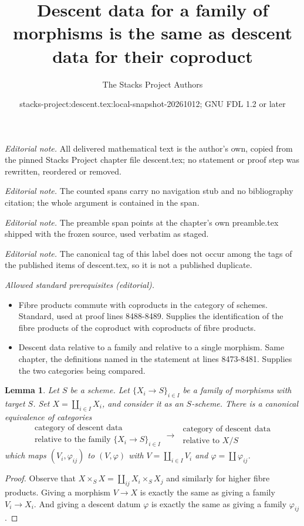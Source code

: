 \documentclass{stacks-project}
\title{Descent data for a family of morphisms is the same as descent data for their coproduct}
\author{The Stacks Project Authors}
\date{stacks-project:descent.tex:local-snapshot-20261012; GNU FDL 1.2 or later}
\theoremstyle{plain}
\newtheorem{lemma}[subsection]{Lemma}
\theoremstyle{definition}
\theoremstyle{remark}
\numberwithin{equation}{subsection}
\begin{document}
\maketitle
\noindent\textit{Editorial note.} All delivered mathematical text is the author's own, copied from the pinned Stacks Project chapter file descent.tex; no statement or proof step was rewritten, reordered or removed.\par\medskip
\noindent\textit{Editorial note.} The counted spans carry no navigation stub and no bibliography citation; the whole argument is contained in the span.\par\medskip
\noindent\textit{Editorial note.} The preamble span points at the chapter's own preamble.tex shipped with the frozen source, used verbatim as staged.\par\medskip
\noindent\textit{Editorial note.} The canonical tag of this label does not occur among the tags of the published items of descent.tex, so it is not a published duplicate.\par\medskip
\noindent\textit{Allowed standard prerequisites (editorial).}\begin{itemize}
\item Fibre products commute with coproducts in the category of schemes. Standard, used at proof lines 8488-8489. Supplies the identification of the fibre products of the coproduct with coproducts of fibre products.
\item Descent data relative to a family and relative to a single morphism. Same chapter, the definitions named in the statement at lines 8473-8481. Supplies the two categories being compared.
\end{itemize}\medskip
\begin{lemma}
\label{lemma-family-is-one}
Let $S$ be a scheme.
Let $\{X_i \to S\}_{i \in I}$ be a family of morphisms with target $S$.
Set $X = \coprod_{i \in I} X_i$, and consider it as an $S$-scheme.
There is a canonical equivalence of categories
$$
\begin{matrix}
\text{category of descent data } \\
\text{relative to the family } \{X_i \to S\}_{i \in I}
\end{matrix}
\longrightarrow
\begin{matrix}
\text{ category of descent data} \\
\text{ relative to } X/S
\end{matrix}
$$
which maps $(V_i, \varphi_{ij})$ to $(V, \varphi)$ with
$V = \coprod_{i\in I} V_i$ and $\varphi = \coprod \varphi_{ij}$.
\end{lemma}

\begin{proof}
Observe that $X \times_S X = \coprod_{ij} X_i \times_S X_j$
and similarly for higher fibre products.
Giving a morphism $V \to X$ is exactly the same as
giving a family $V_i \to X_i$. And giving a descent datum
$\varphi$ is exactly the same as giving a family $\varphi_{ij}$.
\end{proof}
\end{document}
